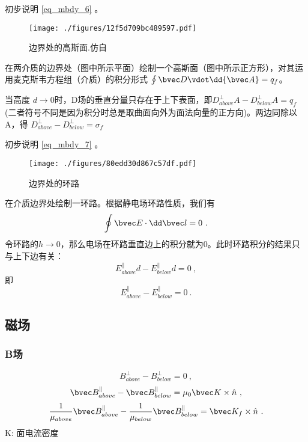 \begin{example}{}
初步说明 \autoref{eq_mbdy_6} 。
\begin{figure}[ht]
\centering
\texttt{[image: ./figures/12f5d709bc489597.pdf]}
\caption{边界处的高斯面.仿自\cite{GriffE}} \label{fig_mbdy_1}
\end{figure}
在两介质的边界处（图中所示平面）绘制一个高斯面（图中所示正方形），对其运用麦克斯韦方程组（介质）的积分形式 $\oint \bvec D \vdot \dd{\bvec A} = q_f$。

当高度 $d\rightarrow0$时，D场的垂直分量只存在于上下表面，即$D^\perp_{above} A- D^\perp_{below} A= q_f$ (二者符号不同是因为积分时总是取曲面向外为面法向量的正方向)。两边同除以A，得 $D^\perp_{above} - D^\perp_{below} = \sigma_f$
\end{example}

\begin{example}{}
初步说明 \autoref{eq_mbdy_7} 。
\begin{figure}[ht]
\centering
\texttt{[image: ./figures/80edd30d867c57df.pdf]}
\caption{边界处的环路} \label{fig_mbdy_3}
\end{figure}

在介质边界处绘制一环路。根据静电场环路性质，我们有
$$ \oint \bvec E \cdot \dd \bvec l = 0~.$$
令环路的$h\to0$，那么电场在环路垂直边上的积分就为$0$。此时环路积分的结果只与上下边有关：
$$ E_{above}^\parallel d-E_{below}^\parallel d = 0~,$$
即
$$ E_{above}^\parallel-E_{below}^\parallel = 0~.$$

\end{example}

\subsection{磁场}

\subsubsection{B场}
\begin{equation}
B^\perp_{above} - B^\perp_{below} = 0~,
\end{equation}
\begin{equation}
\bvec B^\parallel_{above} - \bvec B^\parallel_{below} = \mu_0\bvec K \times \hat n ~,
\end{equation}
\begin{equation}\label{eq_mbdy_2}
\frac{1}{\mu_{above}}\bvec B^\parallel_{above} - \frac{1}{\mu_{below}} \bvec B^\parallel_{below} = \bvec K_f \times \hat n ~.
\end{equation}
K: 面电流密度

